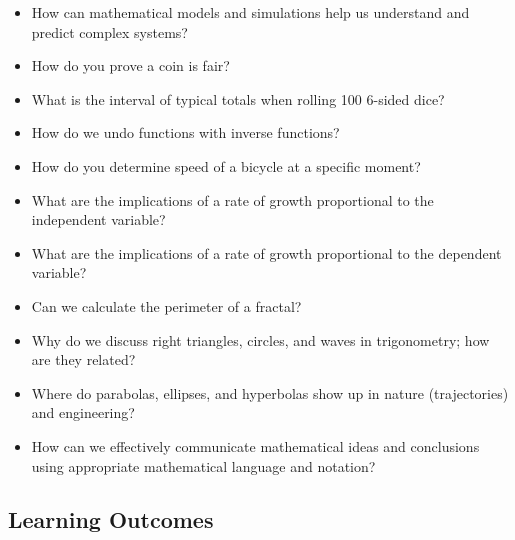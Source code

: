 \documentclass[12pt]{article}
\begin{document}
\begin{itemize}
\item How can mathematical models and simulations help us understand and predict complex systems?
\item How do you prove a coin is fair?
\item What is the interval of typical totals when rolling 100 6-sided dice?
\item How do we undo functions with inverse functions?
\item How do you determine speed of a bicycle at a specific moment?
\item What are the implications of a rate of growth  proportional to the independent variable?
\item What are the implications of a rate of growth  proportional to the dependent variable?
\item Can we calculate the perimeter of a fractal?
\item Why do we discuss right triangles, circles, and waves in trigonometry; how are they related?
\item Where do parabolas, ellipses, and hyperbolas show up in nature (trajectories) and engineering?
\item How can we effectively communicate mathematical ideas and conclusions using appropriate mathematical language and notation?
\end{itemize}

\subsection*{Learning Outcomes}
\end{document}
